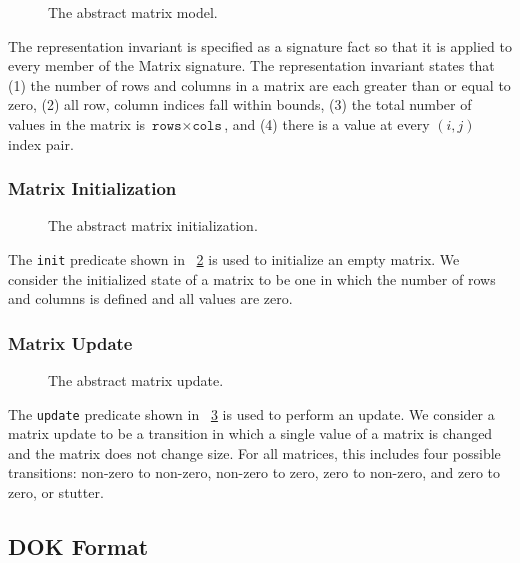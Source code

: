 \documentclass[11pt,conference]{IEEEtran}
\begin{document}
\begin{figure}
\centering

\caption{The abstract matrix model.}
\label{model:abstract}
\end{figure}

The representation invariant is specified as a signature fact so that it is applied to every member of the Matrix signature.  The representation invariant states that (1) the number of rows and columns in a matrix are each greater than or equal to zero, (2) all row, column indices fall within bounds, (3) the total number of values in the matrix is $\texttt{rows}\times\texttt{cols}$, and (4) there is a value at every $\left(i, j\right)$ index pair.

\subsubsection{Matrix Initialization}

\begin{figure}
\centering

\caption{The abstract matrix initialization.}
\label{init:abstract}
\end{figure}

The \texttt{init} predicate shown in \figurename~\ref{init:abstract} is used to initialize an empty matrix.  We consider the initialized state of a matrix to be one in which the number of rows and columns is defined and all values are zero.

\subsubsection{Matrix Update}

\begin{figure}
\centering

\caption{The abstract matrix update.}
\label{update:abstract}
\end{figure}

The \texttt{update} predicate shown in \figurename~\ref{update:abstract} is used to perform an update.  We consider a matrix update to be a transition in which a single value of a matrix is changed and the matrix does not change size.  For all matrices, this includes four possible transitions: non-zero to non-zero, non-zero to zero, zero to non-zero, and zero to zero, or stutter.

\subsection{DOK Format}
\end{document}
